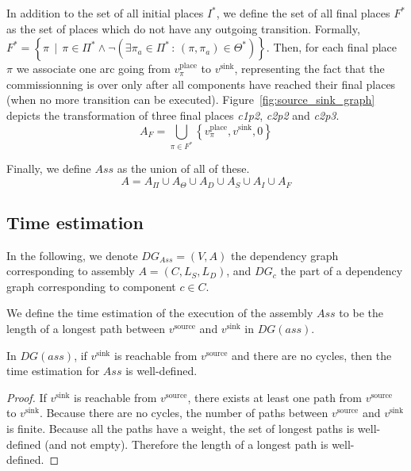 In addition to the set of all initial places $I^*$, we define
the set of all final places $F^*$ as the set of places which
do not have any outgoing transition. Formally,
$F^*=\left\{ \pi\,\mid\,\pi\in\Pi^*\land\lnot\left(\exists\pi_{a}\in\Pi^*\,:\,\left(\pi,\pi_{a}\right)\in\Theta^*\right)\right\} $.
Then, for each final place $\pi$ we associate one arc going from
$v_\pi^\text{place}$ to $v^\text{sink}$, representing the fact that the
commissionning is over only after all components have reached their final places
(\ie when no more transition can be executed).
Figure~\ref{fig:source_sink_graph} depicts the transformation of three final
places \emph{c1p2}, \emph{c2p2} and \emph{c2p3}.
\[
A_F=\bigcup_{\pi\in F^*}\left\{ v_\pi^\text{place},v^\text{sink},0\right\} 
\]



Finally, we define $Ass$ as the union of all of these. 
\[
A=A_\Pi\cup A_{\Theta}\cup A_{D}\cup A_{S}\cup A_{I}\cup A_{F}
\]

\subsection{Time estimation}

In the following, we denote $DG_{Ass}=(V,A)$ the dependency graph corresponding
to assembly $A=(C,L_S,L_D)$, and $DG_c$ the part of a dependency graph
corresponding to component $c \in C$.

We define the time estimation of the execution of the \mad assembly $Ass$
to be the length of a longest path between $v^\text{source}$ and
$v^\text{sink}$ in $DG(ass)$.

\begin{lemma}
 In $DG(ass)$, if $v^\text{sink}$ is reachable from $v^\text{source}$ and there
 are no cycles, then the time estimation for $Ass$ is well-defined.
 \label{lemma:well_defined}
\end{lemma}

\begin{proof}
 If $v^\text{sink}$ is reachable from $v^\text{source}$, there exists at least
 one path from $v^\text{source}$ to  $v^\text{sink}$. Because there are no
 cycles, the number of paths between $v^\text{source}$ and $v^\text{sink}$ is
 finite. Because all the paths have a weight, the set of longest paths is
 well-defined (and not empty). Therefore the length of a longest path is
 well-defined.
\end{proof}

